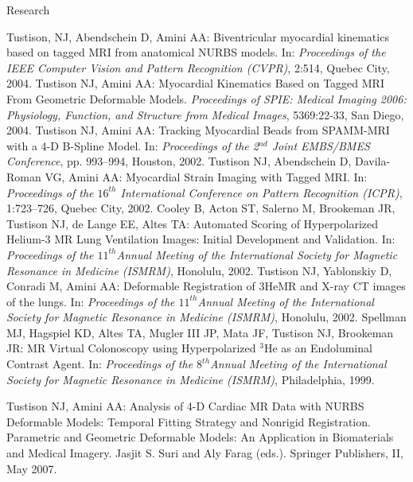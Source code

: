 \documentclass{resume}
\begin{document}
\begin{category}{Research}
\begin{itemize}
    \citemnobullet  Tustison, NJ, Abendschein D, Amini AA: Biventricular myocardial kinematics based on tagged MRI from anatomical NURBS models. In:  {\em Proceedings of the IEEE Computer Vision and Pattern Recognition (CVPR)}, 2:514, Quebec City, 2004.
    \citemnobullet  Tustison NJ, Amini AA: Myocardial Kinematics Based on Tagged MRI From Geometric Deformable Models. {\em Proceedings of SPIE:  Medical Imaging 2006:  Physiology, Function, and Structure from Medical Images}, 5369:22-33, San Diego, 2004.
    \citemnobullet  Tustison NJ, Amini AA: Tracking Myocardial Beads from SPAMM-MRI with a 4-D B-Spline Model. In:  {\em Proceedings of the 2$^{nd}$ Joint EMBS/BMES Conference}, pp. 993--994, Houston, 2002.
    \citemnobullet Tustison NJ, Abendschein D, Davila-Roman VG, Amini AA: Myocardial Strain Imaging with Tagged MRI. In: {\em Proceedings of the $16^{th}$ International Conference on Pattern Recognition (ICPR)}, 1:723--726, Quebec City, 2002.
    \citemnobullet Cooley B, Acton ST, Salerno M, Brookeman JR, Tustison NJ, de Lange EE, Altes TA: Automated Scoring of Hyperpolarized Helium-3 MR Lung Ventilation Images: Initial Development and Validation.  In:  {\em Proceedings of the $11^{th}$Annual  Meeting of the International Society for Magnetic Resonance in Medicine (ISMRM)}, Honolulu, 2002.     
    \citemnobullet Tustison NJ, Yablonskiy D, Conradi M, Amini AA: Deformable Registration of 3HeMR and X-ray CT images of the lungs.  In:  {\em Proceedings of the $11^{th}$Annual  Meeting of the International Society for Magnetic Resonance in Medicine (ISMRM)}, Honolulu, 2002.     
    \citemnobullet  Spellman MJ, Hagspiel KD, Altes TA, Mugler III JP, Mata JF, Tustison NJ, Brookeman JR: MR Virtual Colonoscopy using Hyperpolarized $^3$He as an Endoluminal Contrast Agent. In:  {\em Proceedings of the $8^{th}$Annual  Meeting of the International Society for Magnetic Resonance in Medicine (ISMRM)}, Philadelphia, 1999.            
   \end{itemize}


   \begin{itemize}
   \citemnobullet Tustison NJ,  Amini AA: Analysis of 4-D Cardiac MR Data with NURBS Deformable Models:  Temporal Fitting Strategy and Nonrigid Registration. Parametric and Geometric Deformable Models:  An Application in Biomaterials and Medical Imagery. Jasjit S. Suri and Aly Farag (eds.). Springer Publishers, II, May 2007.
   \end{itemize}


\end{category}
\end{document}
